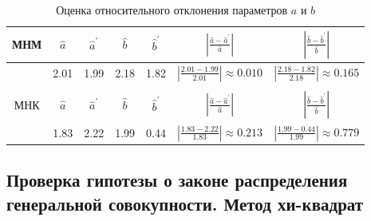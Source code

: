 \begin{table}[H]
	\centering
	\begin{tabular}{| c | c | c | c | c | c | c |}
		
		\hline
		МНМ & $\hat{a}$ &  $\hat{a}^{\prime}$ & $\hat{b}$ & $\hat{b}^{\prime}$ &  $|\frac{\hat{a} - \hat{a}^{\prime}}{\hat{a}}|$ & $|\frac{\hat{b} - \hat{b}^{\prime}}{\hat{b}}|$ \\ \hline
		& 2.01 & 1.99 & 2.18 & 1.82 & $|\frac{2.01 - 1.99}{2.01}| \approx 0.010$  & $|\frac{2.18 - 1.82}{2.18}| \approx 0.165$ \\ \hline
		&  &  &  & & &  \\ \hline
		МНК & $\hat{a}$ &  $\hat{a}^{\prime}$ & $\hat{b}$ & $\hat{b}^{\prime}$ &  $|\frac{\hat{a} - \hat{a}^{\prime}}{\hat{a}}|$ & $|\frac{\hat{b} - \hat{b}^{\prime}}{\hat{b}}|$ \\ \hline
		& 1.83 & 2.22 & 1.99 & 0.44 & $|\frac{1.83 - 2.22}{1.83}| \approx 0.213$  & $|\frac{1.99 - 0.44}{1.99}| \approx 0.779$  \\ \hline
		
	\end{tabular}
	\caption{Оценка относительного отклонения параметров $a$ и $b$}
	\label{tab:relative_deviation}
\end{table}

\subsection{Проверка гипотезы о законе распределения генеральной совокупности. Метод хи-квадрат}


